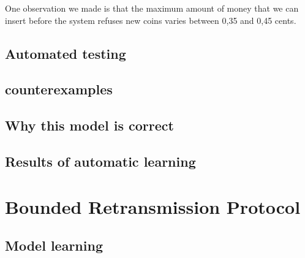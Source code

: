 \documentclass[11pt,a4paper]{article}
\begin{document}
One observation we made is that the maximum amount of money that we
can insert before the system refuses new coins varies between 0,35 and
0,45 cents.

\subsection{Automated testing}

\subsection{counterexamples}

\subsection{Why this model is correct}



\subsection{Results of automatic learning}



\section{Bounded Retransmission Protocol}

\subsection{Model learning}
\end{document}
